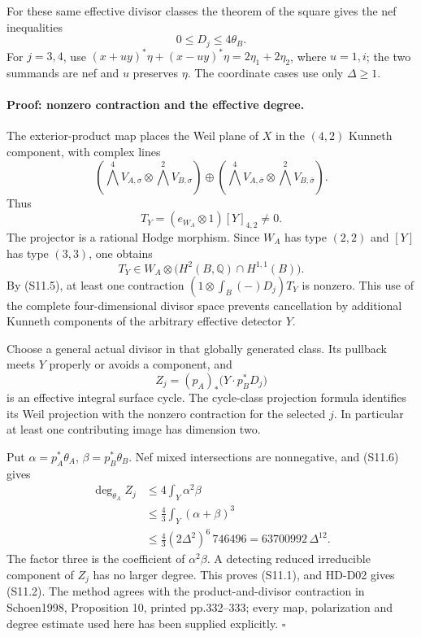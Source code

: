 For these same effective divisor classes the theorem of the
square gives the nef inequalities
\[
 0\le D_j\le4\theta_B.                                    \tag{S11.6}
\]
For \(j=3,4\), use
\((x+uy)^*\eta+(x-uy)^*\eta=2\eta_1+2\eta_2\),
where \(u=1,i\); the two summands are nef and \(u\) preserves
\(\eta\). The coordinate cases use only \(\Delta\ge1\).

\paragraph{Proof: nonzero contraction and the effective degree.}
The exterior-product map places the Weil plane of \(X\) in
the \((4,2)\) Kunneth component, with complex lines
\[
 \left(\bigwedge^4 V_{A,\sigma}\otimes
       \bigwedge^2 V_{B,\sigma}\right)
 \oplus
 \left(\bigwedge^4 V_{A,\bar\sigma}\otimes
       \bigwedge^2 V_{B,\bar\sigma}\right).
\]
Thus
\[
 T_Y=(e_{W_A}\otimes1)[Y]_{4,2}\ne0.
\]
The projector is a rational Hodge morphism. Since \(W_A\) has
type \((2,2)\) and \([Y]\) has type \((3,3)\), one obtains
\[
 T_Y\in W_A\otimes\bigl(H^2(B,\mathbb Q)\cap H^{1,1}(B)\bigr).
\]
By (S11.5), at least one contraction
\((1\otimes\int_B(-)D_j)T_Y\) is nonzero.
This use of the complete four-dimensional divisor space prevents
cancellation by additional Kunneth components of the arbitrary
effective detector \(Y\).

Choose a general actual divisor in that globally generated class.
Its pullback meets \(Y\) properly or avoids a component, and
\[
 Z_j=(p_A)_*\bigl(Y\cdot p_B^*D_j\bigr)
\]
is an effective integral surface cycle. The cycle-class projection
formula identifies its Weil projection with the nonzero contraction
for the selected \(j\). In particular at least one contributing image
has dimension two.

Put \(\alpha=p_A^*\theta_A\), \(\beta=p_B^*\theta_B\).
Nef mixed intersections are nonnegative, and (S11.6) gives
\[
 \begin{split}
 \deg_{\theta_A}Z_j
 &\le4\int_Y\alpha^2\beta\\
 &\le\frac43\int_Y(\alpha+\beta)^3\\
 &\le\frac43(2\Delta^2)^6\,746496
   =63700992\,\Delta^{12}.
 \end{split}
\]
The factor three is the coefficient of \(\alpha^2\beta\).
A detecting reduced irreducible component of \(Z_j\) has no
larger degree. This proves (S11.1), and HD-D02 gives (S11.2).
The method agrees with the product-and-divisor contraction in
Schoen1998, Proposition 10, printed pp.332--333; every map,
polarization and degree estimate used here has been supplied
explicitly. \(\square\)

